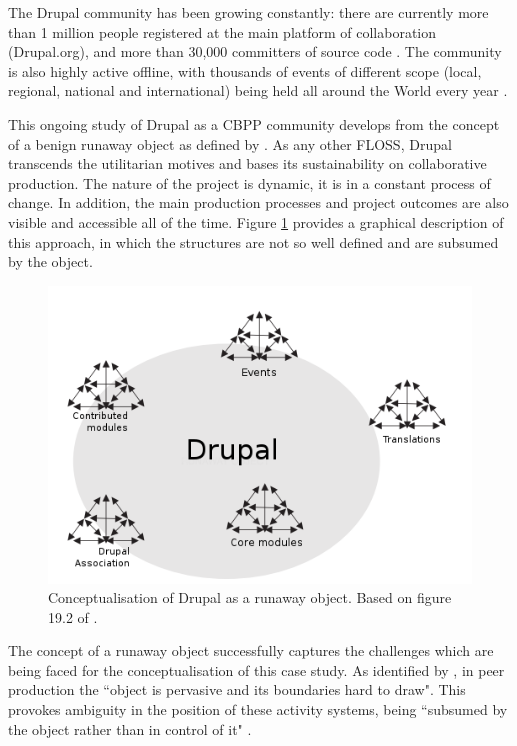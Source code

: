 \documentclass[a4paper, 12pt]{article}
\begin{document}
The Drupal community has been growing constantly: there are currently more than 1 million people registered at the main platform of collaboration (Drupal.org), and more than 30,000 committers of source code \parencite{drupal-about:2013:Online}. The community is also highly active offline, with thousands of events of different scope (local, regional, national and international) being held all around the World every year \parencite{DrupalEvents2010}.

This ongoing study of Drupal as a CBPP community develops from the concept of a benign runaway object as defined by \textcite{engestrom_future_2009}. As any other FLOSS, Drupal transcends the utilitarian motives and bases its sustainability on collaborative production. The nature of the project is dynamic, it is in a constant process of change. In addition, the main production processes and project outcomes are also visible and accessible all of the time. Figure \ref{drupal_runaway_object} provides a graphical description of this approach, in which the structures are not so well defined and are subsumed by the object.


\begin{figure}[h]
	\centering
	\includegraphics[scale=0.6]{img/drupal_runaway_object.png}
	\caption[Conceptualisation of Drupal as a runaway object]%
	{Conceptualisation of Drupal as a runaway object. Based on figure 19.2 of \textcite{engestrom_future_2009}.}
	\label{drupal_runaway_object}
\end{figure}

The concept of a runaway object successfully captures the challenges which are being faced for the conceptualisation of this case study. As identified by \textcite[305]{engestrom_future_2009}, in peer production the ``object is pervasive and its boundaries hard to draw". This provokes ambiguity in the position of these activity systems, being ``subsumed by the object rather than in control of it" \parencite[305]{engestrom_future_2009}.
\end{document}
